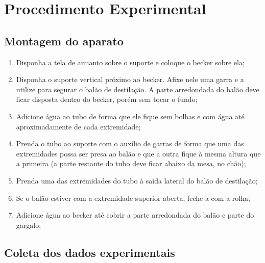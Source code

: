 \section{Procedimento Experimental}

\subsection{Montagem do aparato}

\begin{enumerate}
\item Disponha a tela de amianto sobre o suporte e coloque o becker sobre ela;
\item Disponha o suporte vertical próximo ao becker. Afixe nele uma garra e a utilize para segurar o balão de destilação. A parte arredondada do balão deve ficar disposta dentro do becker, porém sem tocar o fundo;
\item Adicione água ao tubo de forma que ele fique sem bolhas e com água até aproximadamente  de cada extremidade;
\item Prenda o tubo ao suporte com o auxílio de garras de forma que uma das extremidades possa ser presa ao balão e que a outra fique à mesma altura que a primeira (a parte restante do tubo deve ficar abaixo da mesa, no chão);
\item Prenda uma das extremidades do tubo à saída lateral do balão de destilação;
\item Se o balão estiver com a extremidade superior aberta, feche-a com a rolha;
\item Adicione água ao becker até cobrir a parte arredondada do balão e parte do gargalo;
\end{enumerate}

\subsection{Coleta dos dados experimentais}

